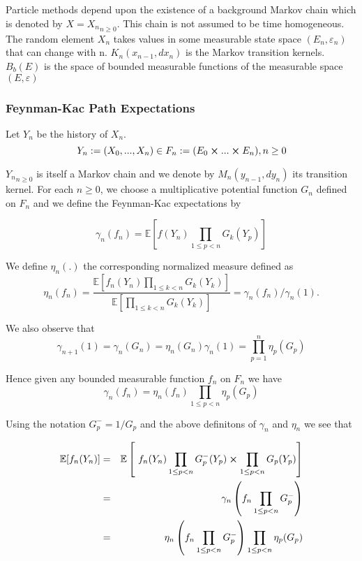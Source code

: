 Particle methods depend upon the existence of a background Markov chain which is denoted by $X = {X_n}_{n\geq 0}$. This chain is not assumed to be time homogeneous. The random element $X_n$ takes values in some measurable state space $(E_n, \varepsilon_n)$ that can change with n. $K_n(x_{n-1}, dx_n)$ is the Markov transition kernels. $B_b(E)$ is the space of bounded measurable functions of the measurable space $(E,\varepsilon)$

\subsubsection{Feynman-Kac Path Expectations}
Let $Y_n$ be the history of $X_n$.
$$Y_n := (X_0,...,X_n) \in F_n := (E_0 \cross ... \cross E_n), n \geq 0$$

${Y_n}_{n\geq 0}$ is itself a Markov chain and we denote by $M_n(y_{n-1},dy_n)$ its transition kernel. For each $n \geq 0$, we choose a multiplicative potential function $G_n$ defined on $F_n$ and we define the Feynman-Kac expectations by

\begin{equation}
\gamma_n(f_n) = \mathbb{E} \left[ f(Y_n) \prod_{1\leq p<n} G_k(Y_p)\right]
\end{equation}

We define $\eta_n(.)$ the corresponding normalized measure defined as
\begin{equation}
\eta_n(f_n) = \frac{\mathbb{E}\left[ f_n(Y_n)\prod_{1\leq k<n}G_k(Y_k) \right]}{\mathbb{E}\left[\prod_{1\leq k<n}G_k(Y_k) \right]} = \gamma_n(f_n)/\gamma_n(1).
\end{equation}

We also observe that
$$\gamma_{n+1}(1) = \gamma_n(G_n) = \eta_n(G_n)\gamma_n(1) = \prod_{p=1}^{n}\eta_p(G_p)$$ 

Hence given any bounded measurable function $f_n$ on $F_n$ we have
$$\gamma_n(f_n) = \eta_n(f_n) \prod_{1\leq p<n}\eta_p(G_p)$$

Using the notation $G_p^- = 1/G_p$ and the above definitons of $\gamma_n$ and $\eta_n$ we see that

\begin{eqnarray}
\mathbb{E}[f_n(Y_n)] & = & \mathbb{E}\left[\ f_n(Y_n) \prod_{1\leq p < n} G_p^-(Y_p) \cross \prod_{1\leq p < n} G_p(Y_p) \right]\\
& = & \gamma_n\left(  f_n \prod_{1\leq p < n} G_p^- \right)\\
& = & \eta_n\left(  f_n \prod_{1\leq p < n} G_p^- \right) \prod_{1\leq p < n} \eta_p(G_p)
\end{eqnarray}

